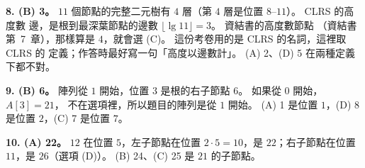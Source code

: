 \begin{pastsoln}
\textbf{8. (B) 3。} $11$ 個節點的完整二元樹有 $4$ 層（第 $4$ 層是位置 $8$--$11$）。 CLRS 的高度數
邊，是根到最深葉節點的邊數 $\lfloor \lg 11 \rfloor = 3$。 資結書的高度數節點
（資結書第~7~章），那樣算是 $4$，就會選 (C)。 這份考卷用的是 CLRS 的名詞，這裡取 CLRS 的
定義；作答時最好寫一句「高度以邊數計」。 (A) 2、(D) 5 在兩種定義下都不對。

\textbf{9. (B) 6。} 陣列從 $1$ 開始，位置 $3$ 是根的右子節點 $6$。 如果從 $0$ 開始，$A[3] = 21$，
不在選項裡，所以題目的陣列是從 $1$ 開始。 (A) 1 是位置 $1$，(D) 8 是位置 $2$，(C) 7 是位置 $7$。

\textbf{10. (A) 22。} $12$ 在位置 $5$，左子節點在位置 $2 \cdot 5 = 10$，是 $22$；右子節點在位置
$11$，是 $26$（選項 (D)）。 (B) 24、(C) 25 是 $21$ 的子節點。
\end{pastsoln}
